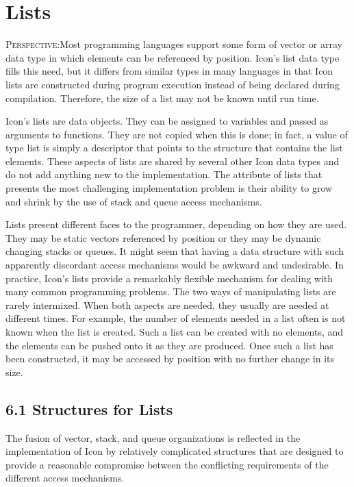 \chapter{Lists}

\textsc{Perspective}:Most programming languages support some form of
vector or array data type in which elements can be referenced by
position. Icon's list data type fills this need, but it differs from
similar types in many languages in that Icon lists are constructed
during program execution instead of being declared during
compilation. Therefore, the size of a list may not be known until run
time.

Icon's lists are data objects. They can be assigned to variables and
passed as arguments to functions. They are not copied when this is
done; in fact, a value of type list is simply a descriptor that points
to the structure that contains the list elements. These aspects of
lists are shared by several other Icon data types and do not add
anything new to the implementation. The attribute of lists that
presents the most challenging implementation problem is their ability
to grow and shrink by the use of stack and queue access mechanisms.

Lists present different faces to the programmer, depending on how they
are used. They may be static vectors referenced by position or they
may be dynamic changing stacks or queues. It might seem that having a
data structure with such apparently discordant access mechanisms would
be awkward and undesirable. In practice, Icon's lists provide a
remarkably flexible mechanism for dealing with many common programming
problems. The two ways of manipulating lists are rarely
intermixed. When both aspects are needed, they usually are needed at
different times. For example, the number of elements needed in a list
often is not known when the list is created. Such a list can be
created with no elements, and the elements can be pushed onto it as
they are produced. Once such a list has been constructed, it may be
accessed by position with no further change in its size.

\section[6.1 Structures for Lists]{6.1 Structures for Lists}

The fusion of vector, stack, and queue organizations is reflected in
the implementation of Icon by relatively complicated structures that
are designed to provide a reasonable compromise between the
conflicting requirements of the different access mechanisms.


